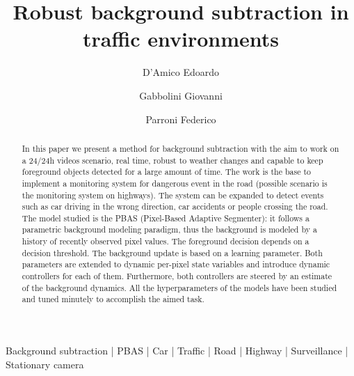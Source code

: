 
\title{Robust background subtraction in traffic environments}

\author[1 \space *]{D'Amico Edoardo}
\author[1 \space *]{Gabbolini Giovanni}
\author[1 \space *]{Parroni Federico}


\maketitle

\begin{abstract}
In this paper we present a method for background subtraction with the aim to work on a 24/24h videos
scenario, real time, robust to weather changes and capable to keep foreground objects detected for a
large amount of time. The work is the base to implement a monitoring system for dangerous event in
the road (possible scenario is the monitoring system on highways). The system can be expanded to
detect events such as car driving in the wrong direction, car accidents or people crossing the road.
The model studied is the PBAS (Pixel-Based Adaptive Segmenter): it follows a parametric background
modeling paradigm, thus the background is modeled by a history of recently observed pixel values.
The foreground decision depends on a decision threshold. The background update is based on a learning
parameter. Both parameters are extended to dynamic per-pixel state variables and introduce dynamic
controllers for each of them. Furthermore, both controllers are steered by an estimate of the background
dynamics. All the hyperparameters of the models have been studied and tuned minutely to accomplish the
aimed task.
\end {abstract}

\begin{keywords}
    Background subtraction | PBAS | Car | Traffic | Road | Highway | Surveillance | Stationary camera
\end{keywords}


